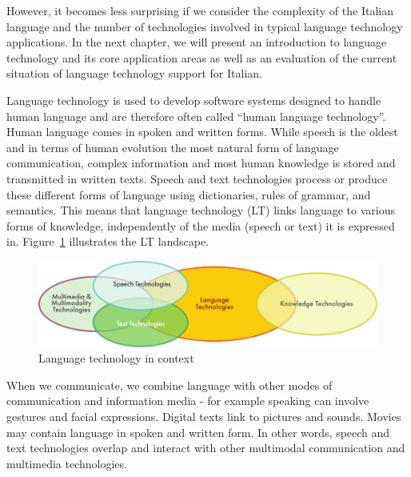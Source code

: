 \documentclass[]{../../metanetpaper}
\begin{document}
\begin{multicols}{2}
However, it becomes less surprising if we consider the complexity of the
Italian language and the number of technologies involved in typical language 
technology applications. In the next chapter, we will present an introduction 
to language technology and its core application areas as well as an evaluation 
of the current situation of language technology support for Italian. 


\end{multicols}

\clearpage


\begin{multicols}{2}

Language technology is used to develop software systems designed to handle
human language and are therefore often called “human language
technology”. Human language comes in spoken and written forms. While speech is
the oldest and in terms of human evolution the most natural form of language
communication, complex information and most human knowledge is stored and
transmitted in written texts. Speech and text technologies process or produce
these different forms of language using dictionaries, rules of grammar, and
semantics. This means that language technology (LT) links language to various
forms of knowledge, independently of the media (speech or text) it is
expressed in. Figure~\ref{fig:ltincontext_en} illustrates the LT landscape. 


\begin{figure}[htb]
  \center
  \includegraphics[width=\textwidth]{../_media/english/language_technologies}
  \caption{Language technology in context}
  \label{fig:ltincontext_en}
\end{figure}



When we communicate, we combine language with other modes of communication and
information media - for example speaking can involve gestures and facial
expressions. Digital texts link to pictures and sounds. Movies may contain
language in spoken and written form. In other words, speech and text
technologies overlap and interact with other multimodal communication and
multimedia technologies.


\end{multicols}
\end{document}
